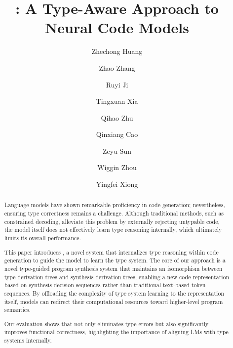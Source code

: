 \documentclass[manuscript,screen]{acmart}
\begin{document}
\title{\mainname: A Type-Aware Approach to Neural Code Models}
\author{Zhechong Huang}
\author{Zhao Zhang}
\author{Ruyi Ji}
\author{Tingxuan Xia}
\author{Qihao Zhu}
\author{Qinxiang Cao}
\author{Zeyu Sun}
\author{Wiggin Zhou}
\author{Yingfei Xiong}


\begin{abstract}
Language models have shown remarkable proficiency in code generation; nevertheless, ensuring type correctness remains a challenge. Although traditional methods, such as constrained decoding, alleviate this problem by externally rejecting untypable code, the model itself does not effectively learn type reasoning internally, which ultimately limits its overall performance. 

This paper introduces \mainname, a novel system that internalizes type reasoning within code generation to guide the model to learn the type system. 
The core of our approach is a novel type-guided program synthesis system that maintains an isomorphism between type derivation trees and synthesis derivation trees, enabling a new code representation based on synthesis decision sequences rather than traditional text-based token sequences. By offloading the complexity of type system learning to the representation itself, models can redirect their computational resources toward higher-level program semantics.

Our evaluation shows that \mainname not only eliminates type errors but also significantly improves functional correctness, highlighting the importance of aligning LMs with type systems internally.

\end{abstract}
\end{document}
